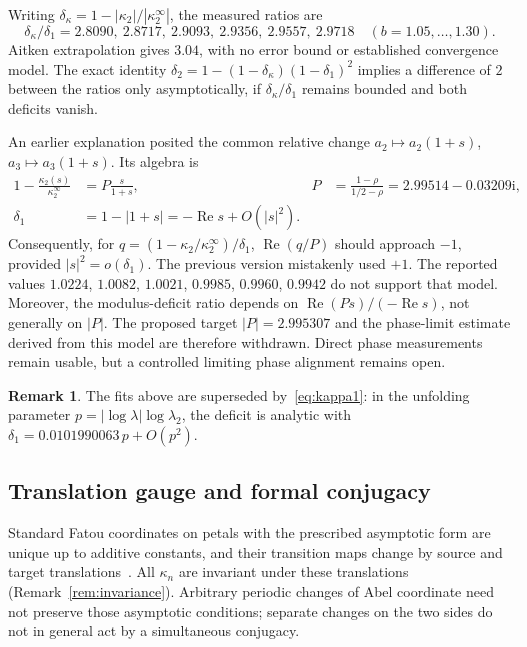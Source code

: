 \documentclass[11pt,a4paper]{article}
\theoremstyle{definition}
\newtheorem{remark}[theorem]{Remark}
\newcommand{\ii}{\mathrm{i}}
\begin{document}
Writing $\delta_\kappa=1-|\kappa_2|/|\kappa_2^\infty|$, the measured ratios are
\[
 \delta_\kappa/\delta_1
 =2.8090,\ 2.8717,\ 2.9093,\ 2.9356,\ 2.9557,\ 2.9718
 \quad (b=1.05,\ldots,1.30).
\]
Aitken extrapolation gives $3.04$, with no error bound or established
convergence model.  The exact identity
$\delta_2=1-(1-\delta_\kappa)(1-\delta_1)^2$ implies a difference of $2$
between the ratios only asymptotically, if $\delta_\kappa/\delta_1$ remains
bounded and both deficits vanish.

An earlier explanation posited the common relative change
$a_2\mapsto a_2(1+s)$, $a_3\mapsto a_3(1+s)$.  Its algebra is
\[
\begin{aligned}
 1-\frac{\kappa_2(s)}{\kappa_2^\infty}&=P\frac{s}{1+s},
 &P&=\frac{1-\rho}{1/2-\rho}=2.99514-0.03209\ii,\\
 \delta_1&=1-|1+s|=-\operatorname{Re}s+O(|s|^2).
\end{aligned}
\]
Consequently, for $q=(1-\kappa_2/\kappa_2^\infty)/\delta_1$,
$\operatorname{Re}(q/P)$ should approach $-1$, provided
$|s|^2=o(\delta_1)$.  The previous version mistakenly used $+1$.
The reported values $1.0224$, $1.0082$, $1.0021$, $0.9985$, $0.9960$, $0.9942$ do not
support that model.  Moreover, the modulus-deficit ratio depends on
$\operatorname{Re}(Ps)/(-\operatorname{Re}s)$, not generally on $|P|$.
The proposed target $|P|=2.995307$ and the phase-limit estimate derived
from this model are therefore withdrawn.  Direct phase measurements remain
usable, but a controlled limiting phase alignment remains open.

\begin{remark}
The fits above are superseded by~\eqref{eq:kappa1}: in the unfolding parameter
$p=|\log\lambda|\log\lambda_2$, the deficit is analytic with
$\delta_1=0.0101990063\,p+O(p^2)$.
\end{remark}

\subsection{Translation gauge and formal conjugacy}\label{sec:onlytwo}

Standard Fatou coordinates on petals with the prescribed asymptotic form
are unique up to additive constants, and their transition maps change by
source and target translations~\cite[Sections 2.2--2.3]{BuffEpstein2002}.
All $\kappa_n$ are invariant under these translations
(Remark~\ref{rem:invariance}).  Arbitrary periodic changes of Abel coordinate
need not preserve those asymptotic conditions; separate changes on the two
sides do not in general act by a simultaneous conjugacy.
\end{document}
